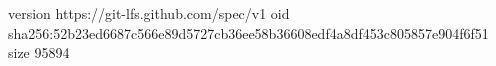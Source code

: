 version https://git-lfs.github.com/spec/v1
oid sha256:52b23ed6687c566e89d5727cb36ee58b36608edf4a8df453c805857e904f6f51
size 95894
